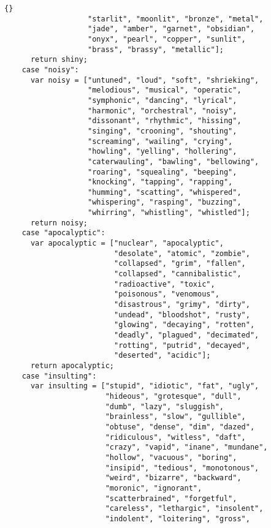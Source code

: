\documentclass[twoside]{article}
\begin{document}
\begin{lstlisting}{}
                   "starlit", "moonlit", "bronze", "metal", 
                   "jade", "amber", "garnet", "obsidian", 
                   "onyx", "pearl", "copper", "sunlit", 
                   "brass", "brassy", "metallic"];
      return shiny;
    case "noisy":
      var noisy = ["untuned", "loud", "soft", "shrieking", 
                   "melodious", "musical", "operatic", 
                   "symphonic", "dancing", "lyrical", 
                   "harmonic", "orchestral", "noisy", 
                   "dissonant", "rhythmic", "hissing", 
                   "singing", "crooning", "shouting", 
                   "screaming", "wailing", "crying", 
                   "howling", "yelling", "hollering", 
                   "caterwauling", "bawling", "bellowing", 
                   "roaring", "squealing", "beeping", 
                   "knocking", "tapping", "rapping", 
                   "humming", "scatting", "whispered", 
                   "whispering", "rasping", "buzzing", 
                   "whirring", "whistling", "whistled"];
      return noisy;
    case "apocalyptic":
      var apocalyptic = ["nuclear", "apocalyptic", 
                         "desolate", "atomic", "zombie", 
                         "collapsed", "grim", "fallen", 
                         "collapsed", "cannibalistic", 
                         "radioactive", "toxic", 
                         "poisonous", "venomous", 
                         "disastrous", "grimy", "dirty", 
                         "undead", "bloodshot", "rusty", 
                         "glowing", "decaying", "rotten", 
                         "deadly", "plagued", "decimated", 
                         "rotting", "putrid", "decayed", 
                         "deserted", "acidic"];
      return apocalyptic;
    case "insulting":
      var insulting = ["stupid", "idiotic", "fat", "ugly", 
                       "hideous", "grotesque", "dull", 
                       "dumb", "lazy", "sluggish", 
                       "brainless", "slow", "gullible", 
                       "obtuse", "dense", "dim", "dazed", 
                       "ridiculous", "witless", "daft", 
                       "crazy", "vapid", "inane", "mundane",
                       "hollow", "vacuous", "boring", 
                       "insipid", "tedious", "monotonous", 
                       "weird", "bizarre", "backward", 
                       "moronic", "ignorant", 
                       "scatterbrained", "forgetful", 
                       "careless", "lethargic", "insolent", 
                       "indolent", "loitering", "gross", 

\end{lstlisting}
\end{document}
